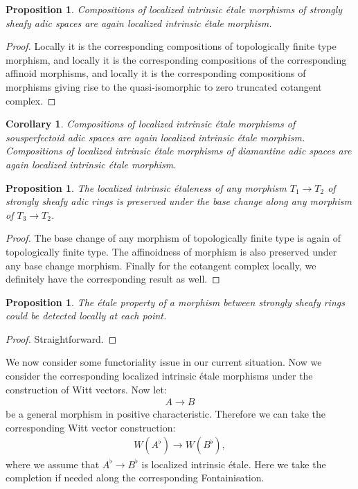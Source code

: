 \documentclass[12pt]{amsart}
\newtheorem{proposition}[theorem]{Proposition}
\newtheorem{corollary}[theorem]{Corollary}
\theoremstyle{definition}
\numberwithin{equation}{section}
\begin{document}
\begin{proposition}
Compositions of localized intrinsic \'etale morphisms of strongly sheafy adic spaces are again localized intrinsic \'etale morphism.	
\end{proposition}


\begin{proof}
Locally it is the corresponding compositions of topologically finite type morphism, and locally it is the corresponding compositions of the corresponding affinoid morphisms, and locally it is the corresponding compositions of morphisms giving rise to the quasi-isomorphic to zero truncated cotangent complex.	
\end{proof}


\begin{corollary}
Compositions of localized intrinsic \'etale morphisms of sousperfectoid adic spaces are again localized intrinsic \'etale morphism. Compositions of localized intrinsic \'etale morphisms of diamantine adic spaces are again localized intrinsic \'etale morphism.		
\end{corollary}


\begin{proposition}
The localized intrinsic \'etaleness of any morphism $T_1\rightarrow T_2$ of strongly sheafy adic rings is preserved under the base change along any morphism of $T_3\rightarrow T_2$.
\end{proposition}

\begin{proof}
The base change of any morphism of topologically finite type is again of topologically finite type. The affinoidness of morphism is also preserved under any base change morphism. Finally for the cotangent complex locally, we definitely have the corresponding result as well.	
\end{proof}


\begin{proposition}
The \'etale property of a morphism between strongly sheafy rings could be detected locally at each point.	
\end{proposition}

\begin{proof}
Straightforward.	
\end{proof}




\indent We now consider some functoriality issue in our current situation. Now we consider the corresponding localized intrinsic \'etale morphisms under the construction of Witt vectors. Now let:
\begin{align}
A\rightarrow B	
\end{align}
be a general morphism in positive characteristic. Therefore we can take the corresponding Witt vector construction:
\begin{align}
W(A^\flat)\rightarrow W(B^\flat),	
\end{align}
where we assume that $A^\flat\rightarrow B^\flat$ is localized intrinsic \'etale. Here we take the completion if needed along the corresponding Fontainisation.
\end{document}
